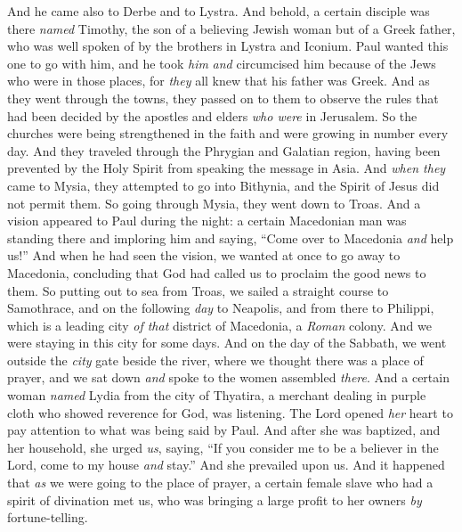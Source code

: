 \begin{biblechapter} %
 And he came also to Derbe and to Lystra. And behold, a certain disciple was there \textit{named} Timothy, the son of a believing Jewish woman but of a Greek father,
\verse who was well spoken of by the brothers in Lystra and Iconium.
\verse Paul wanted this one to go with him, and he took \textit{him} \textit{and} circumcised him because of the Jews who were in those places, for \textit{they} all knew that his father was Greek.
\verse And as they went through the towns, they passed on to them to observe the rules that had been decided by the apostles and elders \textit{who were} in Jerusalem.
\verse So the churches were being strengthened in the faith and were growing in number every day.
 And they traveled through the Phrygian and Galatian region, having been prevented by the Holy Spirit from speaking the message in Asia.
\verse And \textit{when they} came to Mysia, they attempted to go into Bithynia, and the Spirit of Jesus did not permit them.
\verse So going through Mysia, they went down to Troas.
\verse And a vision appeared to Paul during the night: a certain Macedonian man was standing there and imploring him and saying, “Come over to Macedonia \textit{and} help us!”
\verse And when he had seen the vision, we wanted at once to go away to Macedonia, concluding that God had called us to proclaim the good news to them.
 So putting out to sea from Troas, we sailed a straight course to Samothrace, and on the following \textit{day} to Neapolis,
\verse and from there to Philippi, which is a leading city \textit{of that} district of Macedonia, a \textit{Roman} colony. And we were staying in this city for some days.
\verse And on the day of the Sabbath, we went outside the \textit{city} gate beside the river, where we thought there was a place of prayer, and we sat down \textit{and} spoke to the women assembled \textit{there}.
\verse And a certain woman \textit{named} Lydia from the city of Thyatira, a merchant dealing in purple cloth who showed reverence for God, was listening. The Lord opened \textit{her} heart to pay attention to what was being said by Paul.
\verse And after she was baptized, and her household, she urged \textit{us}, saying, “If you consider me to be a believer in the Lord, come to my house \textit{and} stay.” And she prevailed upon us.
 And it happened that \textit{as} we were going to the place of prayer, a certain female slave who had a spirit of divination met us, who was bringing a large profit to her owners \textit{by} fortune-telling.

\end{biblechapter}
